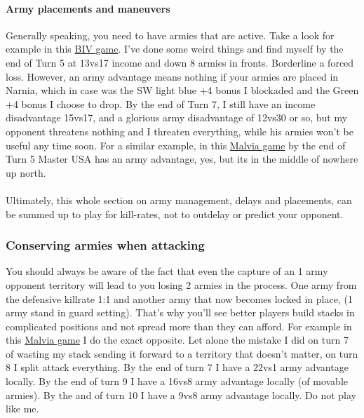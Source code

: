 \paragraph{Army placements and maneuvers}

Generally speaking, you need to have armies that are active. Take a look for example in this \href{https://www.warzone.com/MultiPlayer?GameID=40619054}{BIV game}. I've done some weird things and find myself by the end of Turn 5 at 13vs17 income and down 8 armies in fronts. Borderline a forced loss. However, an army advantage means nothing if your armies are placed in Narnia, which in case was the SW light blue +4 bonus I blockaded and the Green +4 bonus I choose to drop. By the end of Turn 7, I still have an income disadvantage 15vs17, and a glorious army disadvantage of 12vs30 or so, but my opponent threatens nothing and I threaten everything, while his armies won't be useful any time soon. For a similar example, in this \href{https://www.warzone.com/MultiPlayer?GameID=40562183}{Malvia game} by the end of Turn 5 Master USA has an army advantage, yes, but its in the middle of nowhere up north.
\\
\\
Ultimately, this whole section on army management, delays and placements, can be summed up to play for kill-rates, not to outdelay or predict your opponent.

\subsubsection{Conserving armies when attacking}

You should always be aware of the fact that even the capture of an 1 army opponent territory will lead to you losing 2 armies in the process. One army from the defensive killrate 1:1 and another army that now becomes locked in place, (1 army stand in guard setting). That's why you'll see better players build stacks in complicated positions and not spread more than they can afford. For example in this \href{https://www.warzone.com/MultiPlayer?GameID=41215348}{Malvia game} I do the exact opposite. Let alone the mistake I did on turn 7 of wasting my stack sending it forward to a territory that doesn't matter, on turn 8 I split attack everything. By the end of turn 7 I have a 22vs1 army advantage locally. By the end of turn 9 I have a 16vs8 army advantage locally (of movable armies). By the and of turn 10 I have a 9vs8 army advantage locally. Do not play like me.


